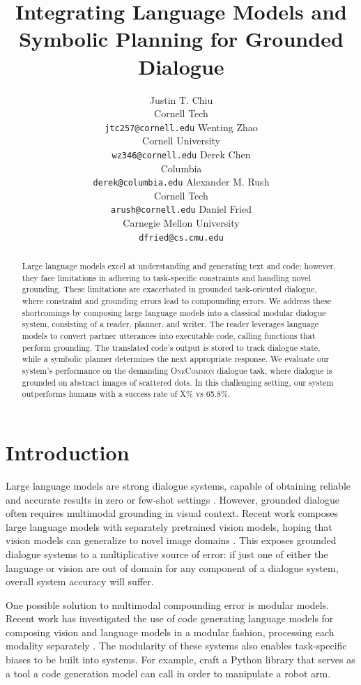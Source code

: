 \documentclass[11pt]{article}
\title{
Integrating Language Models and Symbolic Planning for Grounded Dialogue
}
\author{
Justin T. Chiu  \\
Cornell Tech \\
\texttt{jtc257@cornell.edu}
\And
Wenting Zhao \\
Cornell University \\
\texttt{wz346@cornell.edu}
\And
Derek Chen \\
Columbia \\
\texttt{derek@columbia.edu}
\And
Alexander M. Rush \\
Cornell Tech \\
\texttt{arush@cornell.edu}
\And
Daniel Fried \\
Carnegie Mellon University \\
\texttt{dfried@cs.cmu.edu} 
}
\begin{document}
\maketitle
\begin{abstract}
Large language models excel at understanding and generating text and code; however,
they face limitations in adhering to task-specific constraints and handling novel grounding.
These limitations are exacerbated in grounded task-oriented dialogue,
where constraint and grounding errors lead to compounding errors.
We address these shortcomings by composing large language models
into a classical modular dialogue system,
consisting of a reader, planner, and writer.
The reader leverages language models to convert partner utterances into executable code,
calling functions that perform grounding.
The translated code's output is stored to track dialogue state,
while a symbolic planner determines the next appropriate response.
We evaluate our system's performance on the demanding \textsc{OneCommon} dialogue task,
where dialogue is grounded on abstract images of scattered dots.
In this challenging setting, our system outperforms humans with a success rate of X\% vs 65.8\%.
\end{abstract}

\section{Introduction}
Large language models are strong dialogue systems,
capable of obtaining reliable and accurate results in zero or few-shot settings \citep{fstod,lambda,godel}.
However, grounded dialogue often requires multimodal grounding in visual context.
Recent work composes large language models with separately pretrained vision models,
hoping that vision models can generalize to novel image domains \citep{blip2}.
This exposes grounded dialogue systems to a multiplicative source of error:
if just one of either the language or vision are out of domain for any component of a 
dialogue system, overall system accuracy will suffer.

One possible solution to multimodal compounding error is modular models.
Recent work has investigated the use of code generating language models for composing vision and
language models in a modular fashion, processing each modality separately \citep{codeaspolicies2022,vipergpt}.
The modularity of these systems also enables task-specific biases to be built into systems.
For example, \citet{codeaspolicies2022} craft a Python library that serves as a tool a
code generation model can call in order to manipulate a robot arm.
\end{document}
